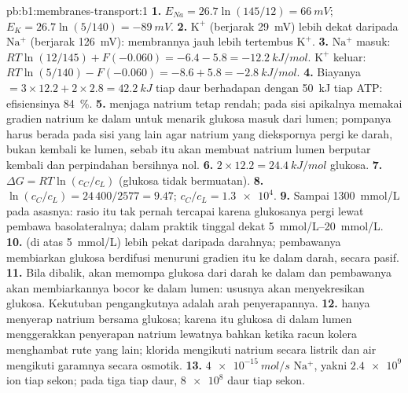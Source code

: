 \begin{solution}{pb:b1:membranes-transport:1}
\textbf{1.} $E_{Na} = 26.7\ln(145/12) = \qty{+66}{mV}$; $E_K =
26.7\ln(5/140) = \qty{-89}{mV}$.
\textbf{2.} $\mathrm{K^+}$ (berjarak \qty{29}{mV}) lebih dekat daripada
$\mathrm{Na^+}$ (berjarak \qty{126}{mV}): membrannya jauh lebih
tertembus $\mathrm{K^+}$.
\textbf{3.} $\mathrm{Na^+}$ masuk: $RT\ln(12/145) + F(-0.060) = -6.4 -
5.8 = \qty{-12.2}{kJ/mol}$. $\mathrm{K^+}$ keluar: $RT\ln(5/140) -
F(-0.060) = -8.6 + 5.8 = \qty{-2.8}{kJ/mol}$.
\textbf{4.} Biayanya $= 3\times 12.2 + 2\times 2.8 = \qty{42.2}{kJ}$
tiap daur berhadapan dengan \qty{50}{kJ} tiap ATP: efisiensinya
\qty{84}{\%}.
\textbf{5.}  menjaga natrium  tetap rendah;
 pada sisi apikalnya memakai gradien natrium ke dalam untuk
menarik glukosa masuk dari lumen; pompanya harus berada pada sisi yang
lain agar natrium yang diekspornya pergi ke darah, bukan kembali ke
lumen, sebab itu akan membuat natrium lumen berputar kembali dan
perpindahan bersihnya nol.
\textbf{6.} $2\times 12.2 = \qty{24.4}{kJ/mol}$ glukosa.
\textbf{7.} $\Delta G = RT\ln(c_C/c_L)$ (glukosa tidak bermuatan).
\textbf{8.} $\ln(c_C/c_L) = 24\,400/2577 = 9.47$; $c_C/c_L =
\num{1.3e4}$.
\textbf{9.} Sampai \qty{1300}{mmol/L} pada asasnya: rasio itu tak pernah
tercapai karena glukosanya pergi lewat pembawa basolateralnya; dalam
praktik  tinggal dekat \qtyrange{5}{20}{mmol/L}.
\textbf{10.}  (di atas \qty{5}{mmol/L}) lebih pekat daripada
darahnya; pembawanya membiarkan glukosa berdifusi menuruni gradien itu
ke dalam darah, secara pasif.
\textbf{11.} Bila dibalik,  akan memompa glukosa dari darah
ke dalam  dan pembawanya akan membiarkannya bocor ke dalam lumen:
ususnya akan menyekresikan glukosa. Kekutuban pengangkutnya adalah arah
penyerapannya.
\textbf{12.}  hanya menyerap natrium bersama glukosa; karena
itu glukosa di dalam lumen menggerakkan penyerapan natrium lewatnya
bahkan ketika racun kolera menghambat rute yang lain; klorida mengikuti
natrium secara listrik dan air mengikuti garamnya secara osmotik.
\textbf{13.} $\qty{4e-15}{mol/s}$ $\mathrm{Na^+}$, yakni $\num{2.4e9}$
ion tiap sekon; pada tiga tiap daur, $\num{8e8}$ daur tiap sekon.

\end{solution}
